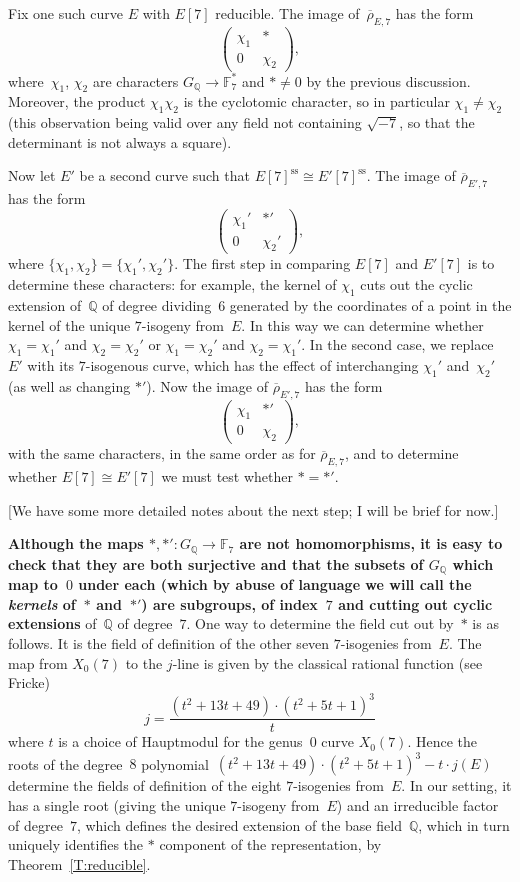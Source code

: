 \documentclass[12pt]{amsart}
\newcommand{\F}{\mathbb{F}}
\newcommand{\Q}{\mathbb{Q}}
\newcommand{\rhobar}{{\overline{\rho}}}
\DeclareMathOperator{\sss}{ss}
\numberwithin{equation}{section}
\theoremstyle{definition}
\theoremstyle{remark}
\begin{document}
Fix one such curve $E$ with $E[7]$ reducible. 
The image
of~$\rhobar_{E,7}$ has the form
\[
  \begin{pmatrix}\chi_1&*\\0&\chi_2  \end{pmatrix},
\]
where~$\chi_1$, $\chi_2$ are characters $G_{\Q}\to\F_7^*$ and $* \neq 0$ by the previous discussion. Moreover, the product $\chi_1\chi_2$ is the cyclotomic
character, so in particular $\chi_1\not=\chi_2$ (this observation
being valid over any field not containing $\sqrt{-7}$, so that the
determinant is not always a square).

Now let $E'$ be a second curve such that $E[7]^{\sss}\cong
E'[7]^{\sss}$. 
The image of $\rhobar_{E',7}$ has the form
\[
  \begin{pmatrix}\chi_1'&*'\\0&\chi_2'  \end{pmatrix},
  \]
where $\{\chi_1,\chi_2\}=\{\chi_1',\chi_2'\}$.  The first step in
comparing $E[7]$ and $E'[7]$ is to determine these characters: for
example, the kernel of $\chi_1$ cuts out the cyclic extension of~$\Q$
of degree dividing~$6$ generated by the coordinates of a point in the
kernel of the unique $7$-isogeny from~$E$. 
In this way we can
determine whether $\chi_1=\chi_1'$ and $\chi_2=\chi_2'$ or $\chi_1=\chi_2'$ and $\chi_2=\chi_1'$.
In the second case, we replace $E'$ with its $7$-isogenous curve,
which has the effect of interchanging $\chi_1'$ 
and~$\chi_2'$ (as well
as changing $*'$).  Now the image of $\rhobar_{E',7}$ has the form
\[
\begin{pmatrix}\chi_1&*'\\0&\chi_2  \end{pmatrix},
\]
with the same characters, in the same order as for $\rhobar_{E,7}$, and
to determine whether $E[7]\cong E'[7]$ we must test whether $*=*'$.

[We have some more detailed notes about the next step; I will be brief
  for now.]

{\bf Although the maps $*,*':G_{\Q}\to\F_7$ are not homomorphisms, it is
easy to check that they are both surjective and that the subsets of
$G_{\Q}$ which map to~$0$ under each (which by abuse of language we
will call the \emph{kernels} of~$*$ and~$*'$) are subgroups, of
index~$7$ and cutting out cyclic extensions} of~$\Q$ of degree~$7$.
One way to determine the field cut out by~$*$ is as follows.  It is
the field of definition of the other seven $7$-isogenies from~$E$.
The map from $X_0(7)$ to the $j$-line is given by the classical
rational function (see Fricke)
\[
   j = \frac{(t^{2} + 13t + 49) \cdot (t^{2} + 5t + 1)^{3}}{t}
   \]
where $t$ is a choice of Hauptmodul for the genus~$0$ curve $X_0(7)$.
Hence the roots of the degree~$8$ polynomial~$(t^{2} + 13t + 49) \cdot
(t^{2} + 5t + 1)^{3} -t\cdot j(E)$ determine the fields of definition
of the eight $7$-isogenies from~$E$.  In our setting, it has a single
root (giving the unique $7$-isogeny from~$E$) and an irreducible
factor of degree~$7$, which defines the desired extension of the base
field~$\Q$, which in turn  uniquely identifies the $*$ component of the
representation, by Theorem~\ref{T:reducible}.
\end{document}
